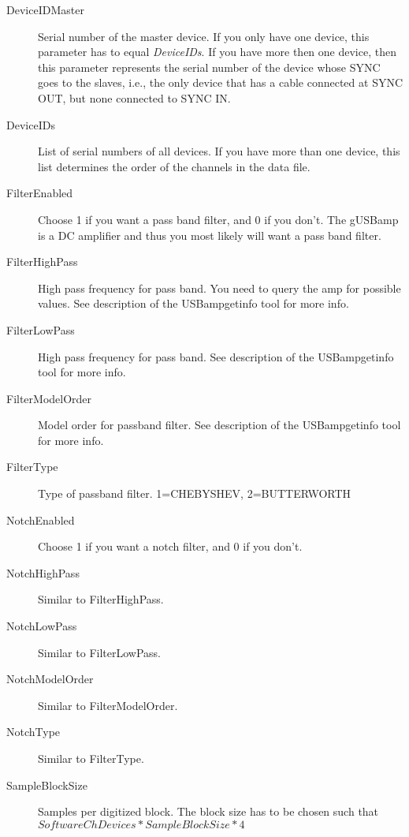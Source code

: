 \documentclass[letterpaper, oneside, 12pt]{article}
\begin{document}
\begin{description}
 \item [DeviceIDMaster] Serial number of the master device. 
                        If you only have one device, this 
                        parameter has to equal \emph{DeviceIDs}.
                        If you have more then one device, then
                        this parameter represents the serial
                        number of the device whose SYNC goes to
                        the slaves, i.e., the only device that 
                        has a cable connected at SYNC OUT, but 
                        none connected to SYNC IN.
 \item [DeviceIDs]      List of serial numbers of all devices.
                        If you have more than one device, this 
                        list determines the order of
                        the channels in the data file.
 \item [FilterEnabled]  Choose 1 if you want a pass band filter,
                        and 0 if you don't. The gUSBamp is a 
                        DC amplifier and thus you most likely
                        will want a pass band filter.
 \item [FilterHighPass] High pass frequency for pass band. You need to query
                        the amp for possible values. See description
                        of the USBampgetinfo tool for more info.
 \item [FilterLowPass]  High pass frequency for pass band. See description
                        of the USBampgetinfo tool for more info.
 \item [FilterModelOrder] Model order for passband filter. See description
                        of the USBampgetinfo tool for more info.
 \item [FilterType]     Type of passband filter. 1=CHEBYSHEV, 2=BUTTERWORTH
 \item [NotchEnabled]   Choose 1 if you want a notch filter,
                        and 0 if you don't.
 \item [NotchHighPass]     Similar to FilterHighPass.
 \item [NotchLowPass]      Similar to FilterLowPass.
 \item [NotchModelOrder]   Similar to FilterModelOrder.
 \item [NotchType]         Similar to FilterType.
 \item [SampleBlockSize]   Samples per digitized block. The block size has to 
                           be chosen such that $SoftwareChDevices*SampleBlockSize*4$

\end{description}
\end{document}
